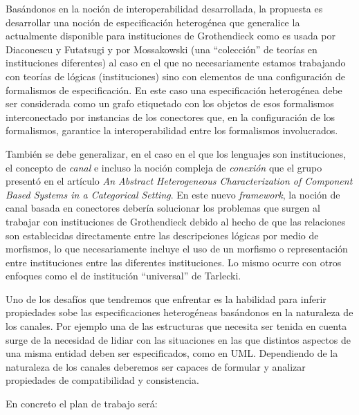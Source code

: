 \documentclass[a4paper, 11pt]{article}
\newcommand{\paperola}{\emph{An Abstract Heterogeneous Characterization of Component Based Systems in a Categorical Setting}}
\begin{document}
Basándonos en la noción de interoperabilidad desarrollada, la propuesta es desarrollar una noción de especificación heterogénea que generalice la actualmente disponible para instituciones de Grothendieck \cite{diaconescu:acs-10_4} como es usada por Diaconescu y Futatsugi \cite{diaconescu:tcs-285_2} y por Mossakowski \cite{mossakowski:tacas07} (una ``colección'' de teorías en instituciones diferentes) al caso en el que no necesariamente estamos trabajando con teorías de lógicas (instituciones) sino con elementos de una configuración de formalismos de especificación. En este caso una especificación heterogénea debe ser considerada como un grafo etiquetado con los objetos de esos formalismos interconectado por instancias de los conectores que, en la configuración de los formalismos, garantice la interoperabilidad entre los formalismos involucrados.

También se debe generalizar, en el caso en el que los lenguajes son instituciones, el concepto de \emph{canal} \cite{fiadeiro:amast96} e incluso la noción compleja de \emph{conexión} que el grupo presentó en el artículo \paperola. En este nuevo \emph{framework}, la noción de canal basada en conectores debería solucionar los problemas que surgen al trabajar con instituciones de Grothendieck debido al hecho de que las relaciones son establecidas directamente entre las descripciones lógicas por medio de morfismos, lo que necesariamente incluye el uso de un morfismo\cite{goguen:fac-02-13} o representación entre instituciones entre las diferentes instituciones. Lo mismo ocurre con otros enfoques como el de institución ``universal'' de Tarlecki.

Uno de los desafíos que tendremos que enfrentar es la habilidad para inferir propiedades sobe las especificaciones heterogéneas basándonos en la naturaleza de los canales. Por ejemplo una de las estructuras que necesita ser tenida en cuenta surge de la necesidad de lidiar con las situaciones en las que distintos aspectos de una misma entidad deben ser especificados, como en UML. Dependiendo de la naturaleza de los canales deberemos ser capaces de formular y analizar propiedades de compatibilidad y consistencia.

\noindent En concreto el plan de trabajo será:
\end{document}
